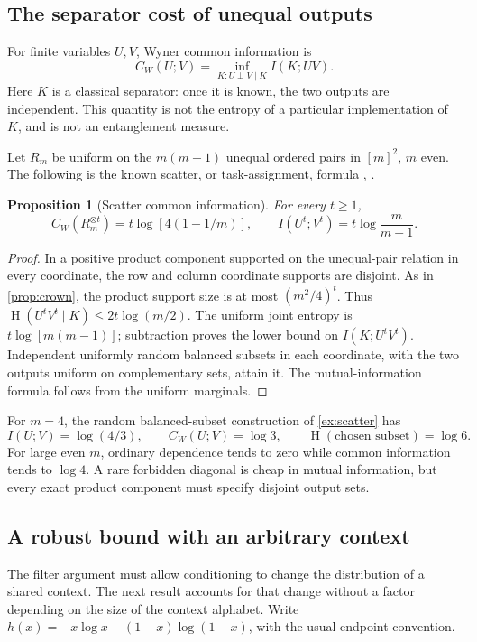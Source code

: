 \documentclass[11pt,reqno]{amsart}
\numberwithin{equation}{section}
\newtheorem{proposition}[theorem]{Proposition}
\theoremstyle{definition}
\theoremstyle{remark}
\DeclareMathOperator{\Ent}{H}
\begin{document}
\subsection{The separator cost of unequal outputs}
For finite variables \(U,V\), Wyner common information \cite{Wyner} is
\[
 C_W(U;V)=\inf_{K:U\perp V\mid K} I(K;UV).
\]
Here \(K\) is a classical separator: once it is known, the two outputs are independent. This quantity is not the entropy of a particular implementation of \(K\), and is not an entanglement measure.

Let \(R_m\) be uniform on the \(m(m-1)\) unequal ordered pairs in \([m]^2\), \(m\) even. The following is the known scatter, or task-assignment, formula \cite[Example~7]{CPC}, \cite[Section~II-H, (44)]{Cuff}.
\begin{proposition}[Scatter common information]\label{prop:CW}
For every \(t\ge1\),
\[
 C_W(R_m^{\otimes t})=t\log[4(1-1/m)],
 \qquad I(U^t;V^t)=t\log\frac m{m-1}.
\]
\end{proposition}
\begin{proof}
In a positive product component supported on the unequal-pair relation in every coordinate, the row and column coordinate supports are disjoint. As in \cref{prop:crown}, the product support size is at most \((m^2/4)^t\). Thus
\(\Ent(U^tV^t\mid K)\le2t\log(m/2)\).
The uniform joint entropy is \(t\log[m(m-1)]\); subtraction proves the lower bound on \(I(K;U^tV^t)\). Independent uniformly random balanced subsets in each coordinate, with the two outputs uniform on complementary sets, attain it. The mutual-information formula follows from the uniform marginals.
\end{proof}

For \(m=4\), the random balanced-subset construction of \cref{ex:scatter} has
\[
 I(U;V)=\log(4/3),\qquad C_W(U;V)=\log3,\qquad
 \Ent(\text{chosen subset})=\log6.
\]
For large even \(m\), ordinary dependence tends to zero while common information tends to \(\log4\). A rare forbidden diagonal is cheap in mutual information, but every exact product component must specify disjoint output sets.

\subsection{A robust bound with an arbitrary context}
The filter argument must allow conditioning to change the distribution of a shared context. The next result accounts for that change without a factor depending on the size of the context alphabet. Write
\(h(x)=-x\log x-(1-x)\log(1-x)\), with the usual endpoint convention.
\end{document}
